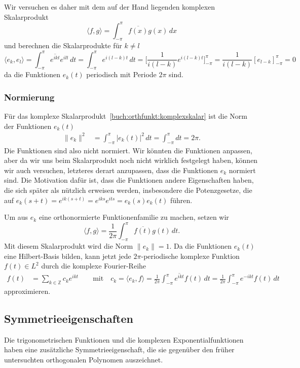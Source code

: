 Wir versuchen es daher mit dem auf der Hand liegenden komplexen
Skalarprodukt
\begin{equation}
\langle f,g\rangle
=
\int_{-\pi}^\pi \overline{f(x)}g(x)\,dx
\label{buch:orthfunkt:komplexskalar}
\end{equation}
und berechnen die Skalarprodukte für $k\ne l$
\[
\langle e_k,e_l\rangle
=
\int_{-\pi}^\pi \overline{e^{ikt}} e^{ilt}\,dt
=
\int_{-\pi}^\pi e^{i(l-k)t}\,dt
=
\biggl[
\frac{1}{i(l-k)} e^{i(l-k)t}
\biggr]_{-\pi}^\pi
=
\frac{1}{i(l-k)}
[ e_{l-k} ]_{-\pi}^\pi
=
0
\]
da die Funktionen $e_k(t)$ periodisch mit Periode $2\pi$ sind.

%
%
\subsubsection{Normierung}
Für das komplexe Skalarprodukt~\eqref{buch:orthfunkt:komplexskalar}
ist die Norm der Funktionen $e_k(t)$
\begin{align*}
\|e_k\|^2
&=
\int_{-\pi}^\pi |e_k(t)|^2\,dt
=
\int_{-\pi}^\pi dt
=
2\pi.
\end{align*}
Die Funktionen sind also nicht normiert.
Wir könnten die Funktionen anpassen, aber da wir uns beim Skalarprodukt
noch nicht wirklich festgelegt haben, können wir auch versuchen, letzteres
derart anzupassen, dass die Funktionen $e_k$ normiert sind.
Die Motivation dafür ist, dass die Funktionen andere Eigenschaften haben,
die sich später als nützlich erweisen werden, insbesondere die 
Potenzgesetze, die auf $e_k(s+t)=e^{ik(s+t)}=e^{iks}e^{its}=e_k(s)e_k(t)$
führen.

Um aus $e_k$ eine orthonormierte Funktionenfamilie zu machen, 
setzen wir
\begin{equation}
\langle f,g\rangle
=
\frac{1}{2\pi}
\int_{-\pi}^\pi \overline{f(t)} g(t)\,dt.
\end{equation}
Mit diesem Skalarprodukt wird die Norm $\|e_k\|=1$.
Da die Funktionen $e_k(t)$ eine Hilbert-Basis bilden, kann jetzt jede
$2\pi$-periodische komplexe Funktion $f(t)\in L^2$ durch die komplexe
Fourier-Reihe
\begin{align*}
f(t)
&=
\sum_{k\in\mathbb{Z}} c_k e^{ikt}
\qquad\text{mit}\quad
c_k
=
\langle e_k,f\rangle
=
\frac{1}{2\pi}
\int_{-\pi}^{\pi}  \overline{e^{ikt}} f(t)\,dt
=
\frac{1}{2\pi}
\int_{-\pi}^{\pi}  e^{-ikt} f(t)\,dt
\end{align*}
approximieren.

%
%
\subsection{Symmetrieeigenschaften
\label{buch:trigo:subsection:symmetrie}}
Die trigonometrischen Funktionen und die komplexen Exponentialfunktionen
haben eine zusätzliche Symmetrieeigenschaft, die sie gegenüber den früher
untersuchten orthogonalen Polynomen auszeichnet.

